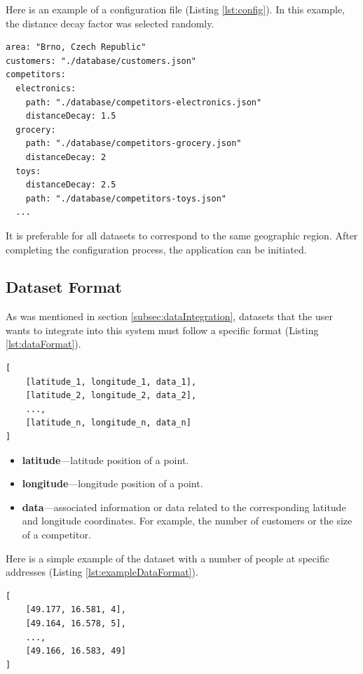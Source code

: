 Here is an example of a configuration file (Listing \ref{lst:config}). In this example, the distance decay factor was selected randomly.

\begin{lstlisting}[caption={Example configuration file.}, label=lst:config]
area: "Brno, Czech Republic"
customers: "./database/customers.json"
competitors:
  electronics:
    path: "./database/competitors-electronics.json"
    distanceDecay: 1.5
  grocery:
    path: "./database/competitors-grocery.json"
    distanceDecay: 2
  toys:
    distanceDecay: 2.5
    path: "./database/competitors-toys.json"
  ...
\end{lstlisting}


It is preferable for all datasets to correspond to the same geographic region. After completing the configuration process, the application can be initiated.

\subsection{Dataset Format}
\label{section:datasetFormat}

As was mentioned in section \ref{subsec:dataIntegration}, datasets that the user wants to integrate into this system must follow a specific format (Listing \ref{lst:dataFormat}).

\begin{lstlisting}[caption={Data format definition.}, label=lst:dataFormat]
[
    [latitude_1, longitude_1, data_1],
    [latitude_2, longitude_2, data_2],
    ...,
    [latitude_n, longitude_n, data_n]
]
\end{lstlisting}

\begin{itemize}
    \item \textbf{latitude}---latitude position of a point.
    \item \textbf{longitude}---longitude position of a point.
    \item \textbf{data}---associated information or data related to the corresponding latitude and longitude coordinates. For example, the number of customers or the size of a competitor.
\end{itemize}

Here is a simple example of the dataset with a number of people at specific addresses (Listing \ref{lst:exampleDataFormat}).

\begin{lstlisting}[caption={Example data with the list of latitude, longitude, and associated data that represent number of people.}, label=lst:exampleDataFormat]
[
    [49.177, 16.581, 4], 
    [49.164, 16.578, 5],
    ...,
    [49.166, 16.583, 49]
]
\end{lstlisting}

